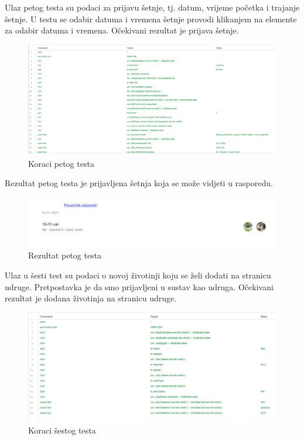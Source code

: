 	\eject

	\noindent Ulaz petog testa su podaci za prijavu šetnje, tj. datum, vrijeme početka i trajanje šetnje. U testu se odabir datuma i vremena šetnje provodi klikanjem na elemente za odabir datuma i vremena. Očekivani rezultat je prijava šetnje.

	\begin{figure}[H]
		\includegraphics[width=\linewidth]{slike/front-testovi-9.png}
		\centering
		\caption{Koraci petog testa}
		\label{fig:fronttestovi9}
	\end{figure}

	\noindent \newline Rezultat petog testa je prijavljena šetnja koja se može vidjeti u rasporedu.

	\begin{figure}[H]
		\includegraphics[width=\linewidth]{slike/front-testovi-10.png}
		\centering
		\caption{Rezultat petog testa}
		\label{fig:fronttestovi10}
	\end{figure}

	\eject

	\noindent Ulaz u šesti test su podaci o novoj životinji koju se želi dodati na stranicu udruge. Pretpostavka je da smo prijavljeni u sustav kao udruga. Očekivani rezultat je dodana životinja na stranicu udruge.

	\begin{figure}[H]
		\includegraphics[width=\linewidth]{slike/front-testovi-11.png}
		\centering
		\caption{Koraci šestog testa}
		\label{fig:fronttestovi11}
	\end{figure}

